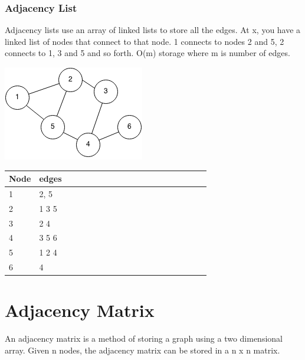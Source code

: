 \documentclass[11pt,oneside]{book}
\makeatletter
\def\maxwidth#1{\ifdim\Gin@nat@width>#1 #1\else\Gin@nat@width\fi}
\makeatother
\begin{document}
\subsubsection{Adjacency List}



Adjacency lists use an array of linked lists to store all the edges. At x, you have a linked list of nodes that connect to 
that node. 1 connects to nodes 2 and 5, 2 connects to 1, 3 and 5 and so forth. O(m) storage where m is number of edges.

\vspace{5px}\includegraphics[width=\maxwidth{\textwidth}]{graph.png}

\vspace{10px}\begin{tabulary}{0.4\linewidth}{|l|l|l|l|l|l|l|l|l|l|l|l|l|l|l|l|l|l|l}\hline


  Node &
  edges\\
\hline


  1 &
  2, 5\\

  2 &
  1 3 5\\

  3 &
  2 4\\

  4 &
  3 5 6\\

  5 &
  1 2 4\\

  6 &
  4\\

\hline\end{tabulary}



        \section{ Adjacency Matrix }
        

An adjacency matrix is a method of storing a graph using a two dimensional array. Given n nodes, the adjacency matrix can be stored in a n x n matrix.
\end{document}
